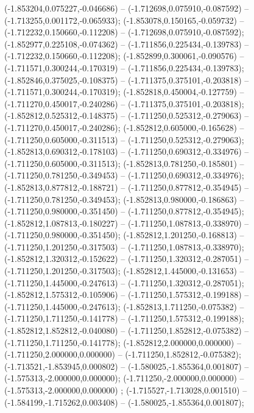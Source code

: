  (-1.853204,0.075227,-0.046686) -- (-1.712698,0.075910,-0.087592) -- (-1.713255,0.001172,-0.065933);
 (-1.853078,0.150165,-0.059732) -- (-1.712232,0.150660,-0.112208) -- (-1.712698,0.075910,-0.087592);
 (-1.852977,0.225108,-0.074362) -- (-1.711856,0.225434,-0.139783) -- (-1.712232,0.150660,-0.112208);
 (-1.852899,0.300061,-0.090576) -- (-1.711571,0.300244,-0.170319) -- (-1.711856,0.225434,-0.139783);
 (-1.852846,0.375025,-0.108375) -- (-1.711375,0.375101,-0.203818) -- (-1.711571,0.300244,-0.170319);
 (-1.852818,0.450004,-0.127759) -- (-1.711270,0.450017,-0.240286) -- (-1.711375,0.375101,-0.203818);
 (-1.852812,0.525312,-0.148375) -- (-1.711250,0.525312,-0.279063) -- (-1.711270,0.450017,-0.240286);
 (-1.852812,0.605000,-0.165628) -- (-1.711250,0.605000,-0.311513) -- (-1.711250,0.525312,-0.279063);
 (-1.852813,0.690312,-0.178103) -- (-1.711250,0.690312,-0.334976) -- (-1.711250,0.605000,-0.311513);
 (-1.852813,0.781250,-0.185801) -- (-1.711250,0.781250,-0.349453) -- (-1.711250,0.690312,-0.334976);
 (-1.852813,0.877812,-0.188721) -- (-1.711250,0.877812,-0.354945) -- (-1.711250,0.781250,-0.349453);
 (-1.852813,0.980000,-0.186863) -- (-1.711250,0.980000,-0.351450) -- (-1.711250,0.877812,-0.354945);
 (-1.852812,1.087813,-0.180227) -- (-1.711250,1.087813,-0.338970) -- (-1.711250,0.980000,-0.351450);
 (-1.852812,1.201250,-0.168813) -- (-1.711250,1.201250,-0.317503) -- (-1.711250,1.087813,-0.338970);
 (-1.852812,1.320312,-0.152622) -- (-1.711250,1.320312,-0.287051) -- (-1.711250,1.201250,-0.317503);
 (-1.852812,1.445000,-0.131653) -- (-1.711250,1.445000,-0.247613) -- (-1.711250,1.320312,-0.287051);
 (-1.852812,1.575312,-0.105906) -- (-1.711250,1.575312,-0.199188) -- (-1.711250,1.445000,-0.247613);
 (-1.852813,1.711250,-0.075382) -- (-1.711250,1.711250,-0.141778) -- (-1.711250,1.575312,-0.199188);
 (-1.852812,1.852812,-0.040080) -- (-1.711250,1.852812,-0.075382) -- (-1.711250,1.711250,-0.141778);
 (-1.852812,2.000000,0.000000) -- (-1.711250,2.000000,0.000000) -- (-1.711250,1.852812,-0.075382);
 (-1.713521,-1.853945,0.000802) -- (-1.580025,-1.855364,0.001807) -- (-1.575313,-2.000000,0.000000);
 (-1.711250,-2.000000,0.000000) -- (-1.575313,-2.000000,0.000000) ;
 (-1.715527,-1.713028,0.001510) -- (-1.584199,-1.715262,0.003408) -- (-1.580025,-1.855364,0.001807);
